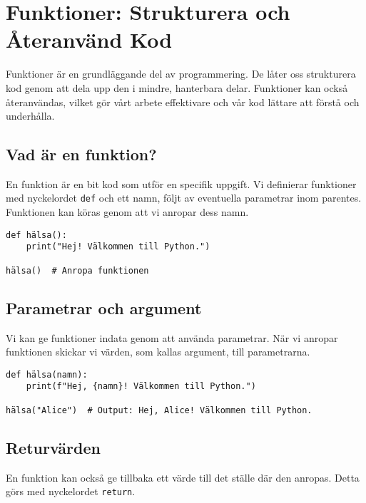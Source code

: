 \section{Funktioner: Strukturera och Återanvänd Kod}
\label{section:functions}

Funktioner är en grundläggande del av programmering. De låter oss strukturera kod genom att dela upp den i mindre, hanterbara delar. Funktioner kan också återanvändas, vilket gör vårt arbete effektivare och vår kod lättare att förstå och underhålla.

\subsection{Vad är en funktion?}
En funktion är en bit kod som utför en specifik uppgift. 
Vi definierar funktioner med nyckelordet \texttt{def} och ett namn, följt av eventuella parametrar inom parentes. 
Funktionen kan köras genom att vi anropar dess namn.

\begin{lstlisting}[title=En enkel funktion]
def hälsa():
    print("Hej! Välkommen till Python.")
    
hälsa()  # Anropa funktionen
\end{lstlisting}

\subsection{Parametrar och argument}
Vi kan ge funktioner indata genom att använda parametrar. När vi anropar funktionen skickar vi värden, som kallas argument, till parametrarna.

\begin{lstlisting}[title=Funktion med parametrar]
def hälsa(namn):
    print(f"Hej, {namn}! Välkommen till Python.")
    
hälsa("Alice")  # Output: Hej, Alice! Välkommen till Python.
\end{lstlisting}


\subsection{Returvärden}
En funktion kan också ge tillbaka ett värde till det ställe där den anropas. Detta görs med nyckelordet \texttt{return}.

